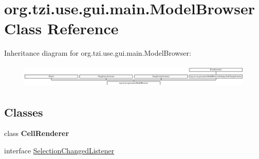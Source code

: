 \hypertarget{classorg_1_1tzi_1_1use_1_1gui_1_1main_1_1_model_browser}{\section{org.\-tzi.\-use.\-gui.\-main.\-Model\-Browser Class Reference}
\label{classorg_1_1tzi_1_1use_1_1gui_1_1main_1_1_model_browser}
}
Inheritance diagram for org.\-tzi.\-use.\-gui.\-main.\-Model\-Browser\-:\begin{figure}[H]
\begin{center}
\leavevmode
\includegraphics[height=1.129032cm]{classorg_1_1tzi_1_1use_1_1gui_1_1main_1_1_model_browser}
\end{center}
\end{figure}
\subsection*{Classes}
\begin{DoxyCompactItemize}
\item 
class {\bfseries Cell\-Renderer}
\item 
interface \hyperlink{interfaceorg_1_1tzi_1_1use_1_1gui_1_1main_1_1_model_browser_1_1_selection_changed_listener}{Selection\-Changed\-Listener}
\end{DoxyCompactItemize}
